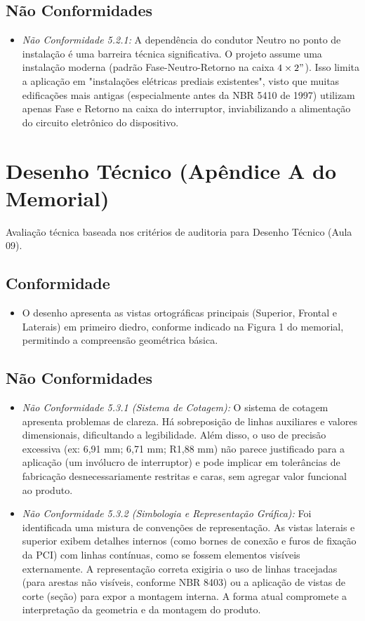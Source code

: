 \documentclass[12pt, openright, a4paper, openany, oneside, chapter=TITLE, section=TITLE, subsection=TITLE, subsubsection=TITLE, subsubsubsection=TITLE, subsubsubsection=TITLE, brazil]{abntex2}
\begin{document}
\subsection{Não Conformidades}
\begin{itemize}
    \item \textit{Não Conformidade 5.2.1:} A dependência do condutor Neutro no ponto de instalação é uma barreira técnica significativa. O projeto assume uma instalação moderna (padrão Fase-Neutro-Retorno na caixa $4 \times 2"$). Isso limita a aplicação em "instalações elétricas prediais existentes", visto que muitas edificações mais antigas (especialmente antes da NBR 5410 de 1997) utilizam apenas Fase e Retorno na caixa do interruptor, inviabilizando a alimentação do circuito eletrônico do dispositivo.
\end{itemize}

\section{Desenho Técnico (Apêndice A do Memorial)}

Avaliação técnica baseada nos critérios de auditoria para Desenho Técnico (Aula 09).

\subsection{Conformidade}
\begin{itemize}
    \item O desenho apresenta as vistas ortográficas principais (Superior, Frontal e Laterais) em primeiro diedro, conforme indicado na Figura 1 do memorial, permitindo a compreensão geométrica básica.
\end{itemize}

\subsection{Não Conformidades}
\begin{itemize}
    \item \textit{Não Conformidade 5.3.1 (Sistema de Cotagem):} O sistema de cotagem apresenta problemas de clareza. Há sobreposição de linhas auxiliares e valores dimensionais, dificultando a legibilidade. Além disso, o uso de precisão excessiva (ex: 6,91 mm; 6,71 mm; R1,88 mm) não parece justificado para a aplicação (um invólucro de interruptor) e pode implicar em tolerâncias de fabricação desnecessariamente restritas e caras, sem agregar valor funcional ao produto.
    
    \item \textit{Não Conformidade 5.3.2 (Simbologia e Representação Gráfica):} Foi identificada uma mistura de convenções de representação. As vistas laterais e superior exibem detalhes internos (como bornes de conexão e furos de fixação da PCI) com linhas contínuas, como se fossem elementos visíveis externamente. A representação correta exigiria o uso de linhas tracejadas (para arestas não visíveis, conforme NBR 8403) ou a aplicação de vistas de corte (seção) para expor a montagem interna. A forma atual compromete a interpretação da geometria e da montagem do produto.
\end{itemize}
\end{document}

